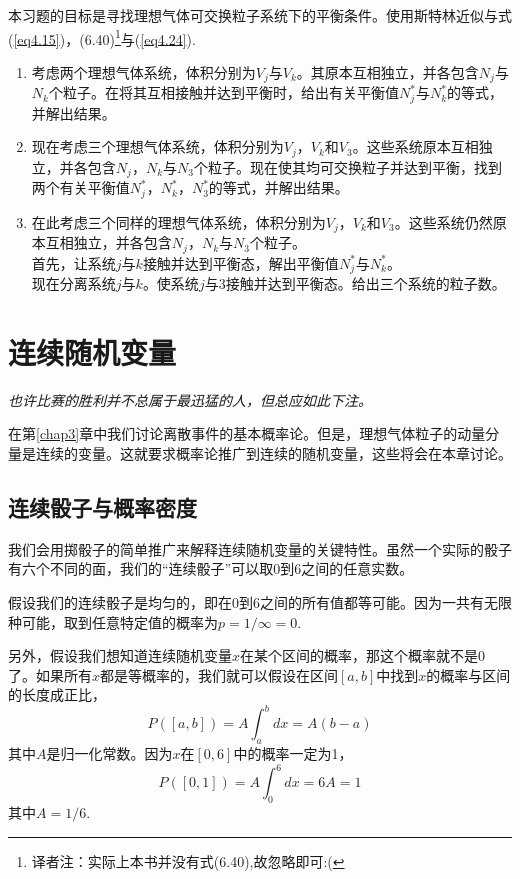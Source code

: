 \documentclass[UTF8]{ctexart}
\numberwithin{equation}{section}%
\numberwithin{figure}{section}%
\begin{document}
    本习题的目标是寻找理想气体可交换粒子系统下的平衡条件。使用斯特林近似与式(\ref{eq4.15})，(6.40)\footnote{译者注：实际上本书并没有式(6.40),故忽略即可:(}与(\ref{eq4.24}).
    \begin{enumerate}
        \item 考虑两个理想气体系统，体积分别为$V_j$与$V_k$。其原本互相独立，并各包含$N_j$与$N_k$个粒子。在将其互相接触并达到平衡时，给出有关平衡值$N_j^*$与$N_k^*$的等式，并解出结果。
        \item 现在考虑三个理想气体系统，体积分别为$V_j$，$V_k$和$V_3$。这些系统原本互相独立，并各包含$N_j$，$N_k$与$N_3$个粒子。现在使其均可交换粒子并达到平衡，找到两个有关平衡值$N_j^*$，$N_k^*$，$N_3^*$的等式，并解出结果。
        \item 在此考虑三个同样的理想气体系统，体积分别为$V_j$，$V_k$和$V_3$。这些系统仍然原本互相独立，并各包含$N_j$，$N_k$与$N_3$个粒子。\\
        首先，让系统$j$与$k$接触并达到平衡态，解出平衡值$N_j^*$与$N_k^*$。\\
        现在分离系统$j$与$k$。使系统$j$与$3$接触并达到平衡态。给出三个系统的粒子数。
    \end{enumerate}
    \clearpage
    \section{连续随机变量}\label{chap5}

    \textit{也许比赛的胜利并不总属于最迅猛的人，但总应如此下注。
    \\}

    在第\ref{chap3}章中我们讨论离散事件的基本概率论。但是，理想气体粒子的动量分量是连续的变量。这就要求概率论推广到连续的随机变量，这些将会在本章讨论。
    \subsection{连续骰子与概率密度}
    我们会用掷骰子的简单推广来解释连续随机变量的关键特性。虽然一个实际的骰子有六个不同的面，我们的“连续骰子”可以取0到6之间的任意实数。

    假设我们的连续骰子是均匀的，即在0到6之间的所有值都等可能。因为一共有无限种可能，取到任意特定值的概率为$p=1/\infty=0$.

    另外，假设我们想知道连续随机变量$x$在某个区间的概率，那这个概率就不是0了。如果所有$x$都是等概率的，我们就可以假设在区间$[a,b]$中找到$x$的概率与区间的长度成正比，
    \begin{equation}
        P([a, b])=A \int_{a}^{b} d x=A(b-a)
    \end{equation}
    其中$A$是归一化常数。因为$x$在$[0,6]$中的概率一定为1，
    \begin{equation}
        P([0,1])=A \int_{0}^{6} d x=6 A=1
    \end{equation}
    其中$A=1/6$.
    
\end{document}
